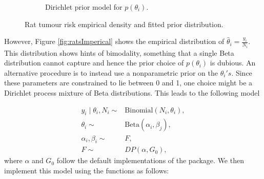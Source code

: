 \documentclass[nojss]{jss}
\begin{document}
\begin{figure}[tb]
\begin{subfigure}[b]{0.5\textwidth}
	\caption{Dirichlet prior model for $p(\theta _i)$.}
	\label{fig:rats_dirichlet_model}
\end{subfigure}
\caption{Rat tumour risk empirical density and fitted prior distribution.}
\end{figure}

However, Figure \ref{fig:ratsImperical} shows the empirical distribution of $\hat{\theta}_i = \frac{y_i}{N_i}$. This distribution shows hints of bimodality, something that a single Beta distribution cannot capture and hence the prior choice of $p(\theta_i)$ is dubious.
An alternative procedure is to instead use a nonparametric prior on the $\theta_i's$. Since these parameters are constrained to lie between 0 and 1, one choice might be a Dirichlet process mixture of Beta distributions. This leads to the following model

\begin{align*}
y_i \mid \theta_i, N_i \sim & \text{Binomial}(N_i,\theta_i), \\
\theta_i \sim & \text{Beta}(\alpha_i, \beta_j), \\
\alpha _i, \beta _i \sim & F, \\
F \sim & DP(\alpha, G_0),
\end{align*}
where $\alpha$ and $G_0$ follow the default implementations of the  package. We then implement this model using the  functions as follows:
\clearpage

\begin{Schunk}
\end{Schunk}
\end{document}
